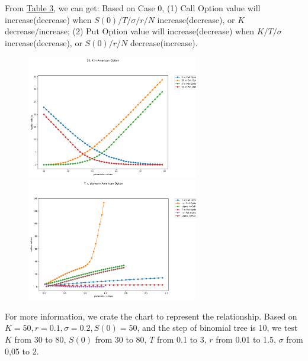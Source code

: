 \documentclass[11pt,a4paper]{article}
\begin{document}
    From \hyperref[T3]{Table 3}, we can get: Based on Case 0,
    (1) Call Option value will increase(decrease) when 
    $ S(0) / T / \sigma / r / N$ increase(decrease), or
    $ K $ decrease/increase; 
    (2) Put Option value will increase(decrease) when
    $ K / T / \sigma $ increase(decrease), or
    $ S(0) / r / N$ decrease(increase).

    \begin{figure}[htbp]
        \centering
        \begin{minipage}[t]{0.48\textwidth}
        \centering
        \includegraphics[width=7.5cm]{S0KAO}
        \end{minipage}
        \begin{minipage}[t]{0.48\textwidth}
        \centering
        \includegraphics[width=7.5cm]{TrsigmaAO}
        \end{minipage}
    \end{figure}


    For more information, we crate the chart to represent
    the relationship.
    Based on $K=50, r=0.1, \sigma=0.2, S(0)=50$, 
    and the step of binomial tree is 10,
    we test $K$ from 30 to 80, $S(0)$ from 30 to 80, 
    $T$ from 0.1 to 3, $r$ from 0.01 to 1.5, 
    $\sigma$ from 0,05 to 2. 
\end{document}
